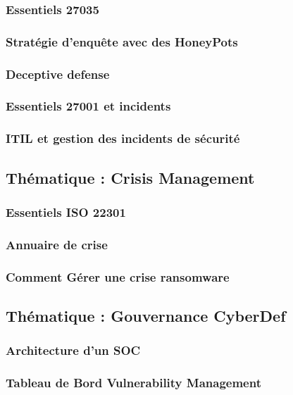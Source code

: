 \subsubsection{Essentiels 27035}
\subsubsection{Stratégie d'enquête avec des HoneyPots}
\subsubsection{Deceptive defense}
\subsubsection{Essentiels 27001 et incidents}
\subsubsection{ITIL et gestion des incidents de sécurité}

\subsection{Thématique : Crisis Management}
\subsubsection{Essentiels ISO 22301}
\subsubsection{Annuaire de crise}
\subsubsection{Comment Gérer une crise ransomware }

\subsection{Thématique : Gouvernance CyberDef}
\subsubsection{Architecture d'un SOC}
\subsubsection{Tableau de Bord Vulnerability Management}

